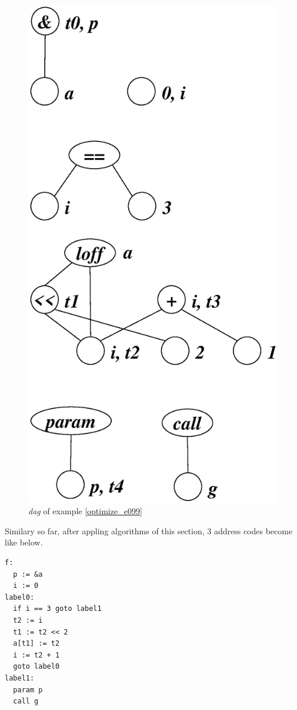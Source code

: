 \begin{Example}
\begin{figure}[htbp]
\begin{center}
\begin{latexonly}
\includegraphics[width=0.619\linewidth,height=1.2\linewidth]{opt043.eps}
\end{latexonly}
\caption{{\em dag} of example \ref{optimize_e099}}
\label{optimize_e100}
\end{center}
\end{figure}
Similary so far, 
after appling algorithms of this section,
3 address codes become like below.
\begin{verbatim}
f:
  p := &a
  i := 0
label0:
  if i == 3 goto label1
  t2 := i
  t1 := t2 << 2
  a[t1] := t2
  i := t2 + 1
  goto label0
label1:
  param p
  call g
\end{verbatim}
\end{Example}

